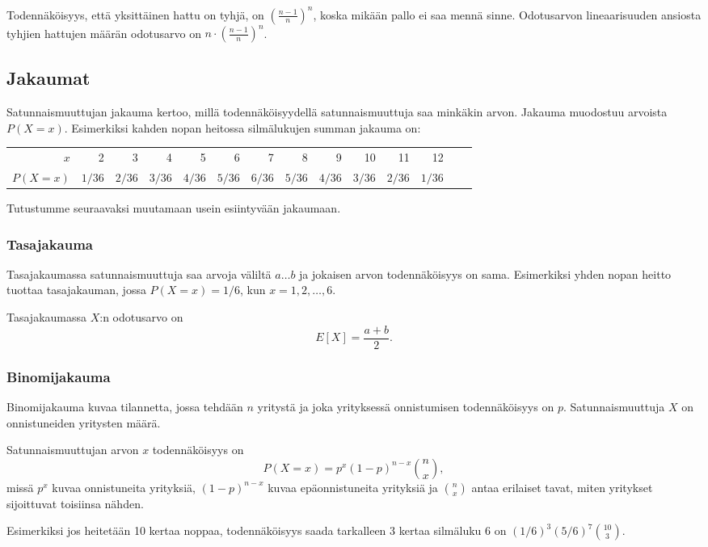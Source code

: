 Todennäköisyys, että yksittäinen hattu on tyhjä,
on $(\frac{n-1}{n})^n$, koska mikään pallo ei saa mennä sinne.
Odotusarvon lineaarisuuden ansiosta tyhjien hattujen
määrän odotusarvo on $n \cdot (\frac{n-1}{n})^n$.

\subsection{Jakaumat}

Satunnaismuuttujan jakauma kertoo,
millä todennäköisyydellä satunnaismuuttuja
saa minkäkin arvon.
Jakauma muodostuu arvoista $P(X=x)$.
Esimerkiksi kahden nopan heitossa
silmälukujen summan jakauma on:
\begin{center}
\small {
\begin{tabular}{r|rrrrrrrrrrrrr}
$x$ & 2 & 3 & 4 & 5 & 6 & 7 & 8 & 9 & 10 & 11 & 12 \\
$P(X=x)$ & $1/36$ & $2/36$ & $3/36$ & $4/36$ & $5/36$ & $6/36$ & $5/36$ & $4/36$ & $3/36$ & $2/36$ & $1/36$ \\
\end{tabular}
}
\end{center}
Tutustumme seuraavaksi muutamaan usein esiintyvään jakaumaan.

\subsubsection*{Tasajakauma}

Tasajakaumassa satunnaismuuttuja
saa arvoja väliltä $a \ldots b$
ja jokaisen arvon todennäköisyys on sama.
Esimerkiksi yhden nopan heitto tuottaa tasajakauman,
jossa $P(X=x)=1/6$, kun $x=1,2,\ldots,6$.

Tasajakaumassa $X$:n odotusarvo on
\[E[X] = \frac{a+b}{2}.\]

\subsubsection*{Binomijakauma}

Binomijakauma kuvaa tilannetta, jossa tehdään $n$
yritystä ja joka yrityksessä onnistumisen
todennäköisyys on $p$. Satunnaismuuttuja $X$
on onnistuneiden yritysten määrä.

Satunnaismuuttujan arvon $x$ todennäköisyys on
\[P(X=x)=p^x (1-p)^{n-x} {n \choose x},\]
missä $p^x$ kuvaa onnistuneita yrityksiä,
$(1-p)^{n-x}$ kuvaa epäonnistuneita yrityksiä
ja ${n \choose x}$ antaa erilaiset tavat,
miten yritykset sijoittuvat toisiinsa nähden.

Esimerkiksi jos heitetään 10 kertaa noppaa,
todennäköisyys saada tarkalleen 3 kertaa silmäluku 6
on $(1/6)^3 (5/6)^7 {10 \choose 3}$.

